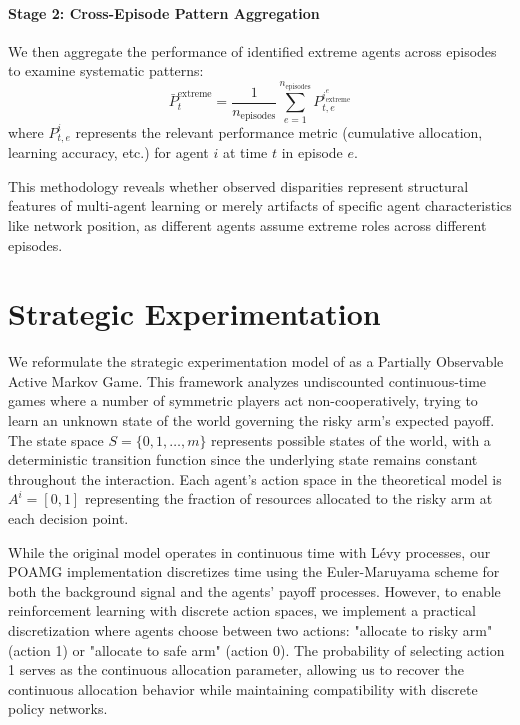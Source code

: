 \paragraph{Stage 2: Cross-Episode Pattern Aggregation} We then aggregate the performance of identified extreme agents across episodes to examine systematic patterns:
\begin{equation}
    \bar{P}_t^{\text{extreme}} = \frac{1}{n_{\text{episodes}}} \sum_{e=1}^{n_{\text{episodes}}} P_{t,e}^{i_{\text{extreme}}^e}
\end{equation}
where $P_{t,e}^i$ represents the relevant performance metric (cumulative allocation, learning accuracy, etc.) for agent $i$ at time $t$ in episode $e$.

This methodology reveals whether observed disparities represent structural features of multi-agent learning or merely artifacts of specific agent characteristics like network position, as different agents assume extreme roles across different episodes.

\section{Strategic Experimentation}

We reformulate the strategic experimentation model of \citet{keller2020undiscounted} as a Partially Observable Active Markov Game. This framework analyzes undiscounted continuous-time games where a number of symmetric players act non-cooperatively, trying to learn an unknown state of the world governing the risky arm's expected payoff. The state space $S = \{0,1,\ldots,m\}$ represents possible states of the world, with a deterministic transition function since the underlying state remains constant throughout the interaction. Each agent's action space in the theoretical model is $A^i = [0,1]$ representing the fraction of resources allocated to the risky arm at each decision point.

While the original model operates in continuous time with Lévy processes, our POAMG implementation discretizes time using the Euler-Maruyama scheme \citep{kloeden1992numerical, platen1999introduction} for both the background signal and the agents' payoff processes. However, to enable reinforcement learning with discrete action spaces, we implement a practical discretization where agents choose between two actions: "allocate to risky arm" (action 1) or "allocate to safe arm" (action 0). The probability of selecting action 1 serves as the continuous allocation parameter, allowing us to recover the continuous allocation behavior while maintaining compatibility with discrete policy networks.


